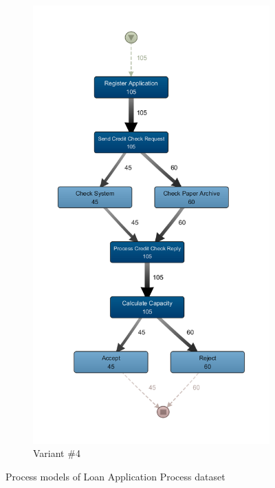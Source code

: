 \begin{figure}
\begin{subfigure}{.4\textwidth}
    \includegraphics[width=.8\linewidth]{5_results_discussions/loan-application-process/ETM_Configuration4}
    \caption{Variant \#4}
    \label{fig:loan-application-process-models-4}
  \end{subfigure}
\caption{Process models of Loan Application Process dataset}
\label{fig:loan-application-process-models}
\end{figure} 

